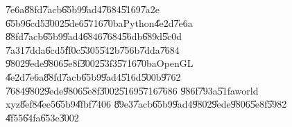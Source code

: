 \begin{figure}[th]
\caption{\U{7e6a}\U{88fd}\U{7acb}\U{65b9}\U{9ad4}\U{7684}\U{5169}\U{7a2e}%
\U{65b9}\U{6cd5}\U{3002}\U{5de6}\U{5716}\U{70ba}Python\U{4e2d}\U{7e6a}%
\U{88fd}\U{7acb}\U{65b9}\U{9ad4}\U{6846}\U{7684}\U{56db}\U{689d}\U{5c0d}%
\U{7a31}\U{7dda}\U{6cd5}\U{ff0c}\U{5305}\U{542b}\U{756b}\U{7dda}\U{7684}%
\U{9802}\U{9ede}\U{9806}\U{5e8f}\U{3002}\U{53f3}\U{5716}\U{70ba}OpenGL%
\U{4e2d}\U{7e6a}\U{88fd}\U{7acb}\U{65b9}\U{9ad4}\U{516d}\U{500b}\U{9762}%
\U{7684}\U{9802}\U{9ede}\U{9806}\U{5e8f}\U{3002}\U{5169}\U{5716}\U{7686}%
\U{986f}\U{793a}\U{51fa}world xyz\U{8ef8}\U{4ee5}\U{65b9}\U{4fbf}\U{7406}%
\U{89e3}\U{7acb}\U{65b9}\U{9ad4}\U{9802}\U{9ede}\U{9806}\U{5e8f}\U{5982}%
\U{4f55}\U{64fa}\U{653e}\U{3002}}
\begin{center}
\end{center}
\end{figure}
